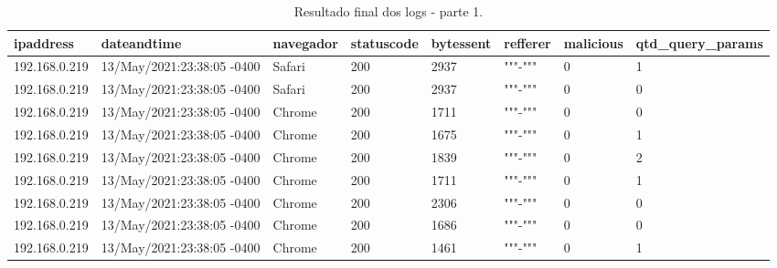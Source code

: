 \begin{table}
\centering

\begin{tabular}{|l|l|l|l|l|l|l|l|}
\hline
ipaddress & dateandtime & navegador & statuscode & bytessent & refferer & malicious & qtd\_query\_params \\ \hline
192.168.0.219 & 13/May/2021:23:38:05 -0400 & Safari & 200 & 2937 & """-""" & 0 & 1 \\ \hline
192.168.0.219 & 13/May/2021:23:38:05 -0400 & Safari & 200 & 2937 & """-""" & 0 & 0 \\ \hline
192.168.0.219 & 13/May/2021:23:38:05 -0400 & Chrome & 200 & 1711 & """-""" & 0 & 0 \\ \hline
192.168.0.219 & 13/May/2021:23:38:05 -0400 & Chrome & 200 & 1675 & """-""" & 0 & 1 \\ \hline
192.168.0.219 & 13/May/2021:23:38:05 -0400 & Chrome & 200 & 1839 & """-""" & 0 & 2 \\ \hline
192.168.0.219 & 13/May/2021:23:38:05 -0400 & Chrome & 200 & 1711 & """-""" & 0 & 1 \\ \hline
192.168.0.219 & 13/May/2021:23:38:05 -0400 & Chrome & 200 & 2306 & """-""" & 0 & 0 \\ \hline
192.168.0.219 & 13/May/2021:23:38:05 -0400 & Chrome & 200 & 1686 & """-""" & 0 & 0 \\ \hline
192.168.0.219 & 13/May/2021:23:38:05 -0400 & Chrome & 200 & 1461 & """-""" & 0 & 1 \\ \hline
\end{tabular}

\caption{Resultado final dos logs - parte 1.\label{tab:exemplo_log}}

\end{table}



